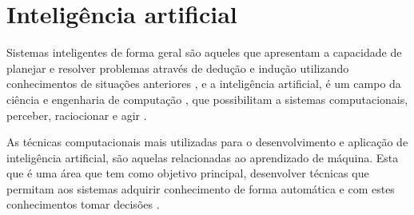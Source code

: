 




\section{Inteligência artificial}



Sistemas inteligentes de forma geral são aqueles que apresentam a capacidade de planejar e resolver problemas através de dedução e indução utilizando conhecimentos de situações anteriores \cite{VonZuben2013}, e a inteligência artificial, é um campo da ciência e engenharia de computação \cite{VonZuben2013}, que possibilitam a sistemas computacionais, perceber, raciocionar e agir \cite{Winston1992}.

As técnicas computacionais mais utilizadas para o desenvolvimento e aplicação de inteligência artificial, são aquelas relacionadas ao aprendizado de máquina. Esta que é uma área que tem como objetivo principal, desenvolver técnicas que permitam aos sistemas adquirir conhecimento de forma automática e com estes conhecimentos tomar decisões \cite{Augusto2007}.

